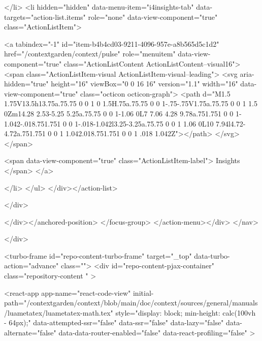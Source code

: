 </li>
        <li hidden="hidden" data-menu-item="i4insights-tab" data-targets="action-list.items" role="none" data-view-component="true" class="ActionListItem">
    
    
    <a tabindex="-1" id="item-b4b4cd03-9211-4096-957e-a8b565d5c1d2" href="/contextgarden/context/pulse" role="menuitem" data-view-component="true" class="ActionListContent ActionListContent--visual16">
        <span class="ActionListItem-visual ActionListItem-visual--leading">
          <svg aria-hidden="true" height="16" viewBox="0 0 16 16" version="1.1" width="16" data-view-component="true" class="octicon octicon-graph">
    <path d="M1.5 1.75V13.5h13.75a.75.75 0 0 1 0 1.5H.75a.75.75 0 0 1-.75-.75V1.75a.75.75 0 0 1 1.5 0Zm14.28 2.53-5.25 5.25a.75.75 0 0 1-1.06 0L7 7.06 4.28 9.78a.751.751 0 0 1-1.042-.018.751.751 0 0 1-.018-1.042l3.25-3.25a.75.75 0 0 1 1.06 0L10 7.94l4.72-4.72a.751.751 0 0 1 1.042.018.751.751 0 0 1 .018 1.042Z"></path>
</svg>
        </span>
      
        <span data-view-component="true" class="ActionListItem-label">
          Insights
</span>      
</a>
  
</li>
</ul>    
</div></action-list>


</div>
      
</div></anchored-position>  </focus-group>
</action-menu></div>
</nav>

  </div>

  



<turbo-frame id="repo-content-turbo-frame" target="_top" data-turbo-action="advance" class="">
    <div id="repo-content-pjax-container" class="repository-content " >
    



    
      
    








<react-app
  app-name="react-code-view"
  initial-path="/contextgarden/context/blob/main/doc/context/sources/general/manuals/luametatex/luametatex-math.tex"
    style="display: block; min-height: calc(100vh - 64px);"
  data-attempted-ssr="false"
  data-ssr="false"
  data-lazy="false"
  data-alternate="false"
  data-data-router-enabled="false"
  data-react-profiling="false"
>
  
